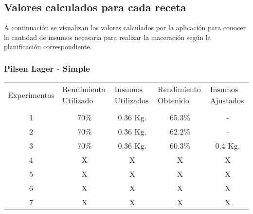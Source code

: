     \subsection{Valores calculados para cada receta}
    \par A continuación se visualizan los valores calculados por la aplicación para conocer la cantidad de insumos necesaria para realizar la maceración según la planificación correspondiente.
        \subsubsection{Pilsen Lager - Simple}
    
    \begin{minipage}{0.95\textwidth}    
    
        \centering
        \begin{tabularx}{\textwidth}{|X|X|X|X|X|}
             \hline
             \multicolumn{1}{|c|}{Experimentos} & \multirow{1}{2cm}{Rendimiento Utilizado} &\multirow{1}{2cm}{Insumos Utilizados}  & \multirow{1}{2cm}{Rendimiento Obtenido} &\multirow{1}{2cm}{Insumos Ajustados}\\
             & & & &\\
             \hline
             \hline
             \multicolumn{1}{|c|}{1} & \multicolumn{1}{c|}{70\%} & \multicolumn{1}{c|}{0.36 Kg.} &\multicolumn{1}{c|}{65.3\%} &\multicolumn{1}{c|}{-} \\
             \hline
             \multicolumn{1}{|c|}{2} & \multicolumn{1}{c|}{70\%}  & \multicolumn{1}{c|}{0.36 Kg.} &\multicolumn{1}{c|}{62.2\%} &\multicolumn{1}{c|}{-} \\
             \hline
             \multicolumn{1}{|c|}{3} & \multicolumn{1}{c|}{70\%} & \multicolumn{1}{c|}{0.36 Kg.} &\multicolumn{1}{c|}{60.3\%} &\multicolumn{1}{c|}{0.4 Kg.} \\
             \hline
             \multicolumn{1}{|c|}{4} & \multicolumn{1}{c|}{X}  & \multicolumn{1}{c|}{X} &\multicolumn{1}{c|}{X} &\multicolumn{1}{c|}{X} \\
             \hline
             \multicolumn{1}{|c|}{5} & \multicolumn{1}{c|}{X}  & \multicolumn{1}{c|}{X} &\multicolumn{1}{c|}{X} &\multicolumn{1}{c|}{X} \\
             \hline
             \multicolumn{1}{|c|}{6} & \multicolumn{1}{c|}{X}  & \multicolumn{1}{c|}{X} &\multicolumn{1}{c|}{X} &\multicolumn{1}{c|}{X} \\
             \hline
             \multicolumn{1}{|c|}{7} & \multicolumn{1}{c|}{X}  & \multicolumn{1}{c|}{X} &\multicolumn{1}{c|}{X} &\multicolumn{1}{c|}{X} \\

\end{tabularx}
\end{minipage}
